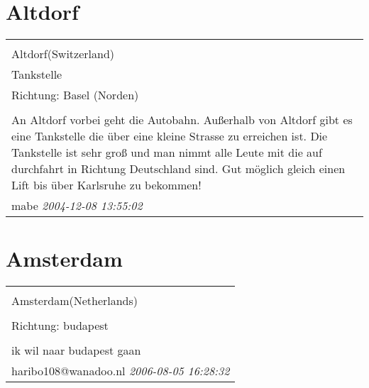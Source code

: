 \documentclass[a4paper,12pt]{article}
\begin{document}
\section{Altdorf}
\begin{tabular}{|p{13cm}|}
\hline\\
Altdorf(Switzerland)\\
Tankstelle\\
Richtung: Basel (Norden) \\
\hline\\
An Altdorf vorbei geht die Autobahn. Außerhalb von Altdorf gibt es eine Tankstelle die über eine kleine Strasse zu erreichen ist. Die Tankstelle ist sehr groß und man nimmt alle Leute mit die auf durchfahrt in Richtung Deutschland sind. Gut möglich gleich einen Lift bis über Karlsruhe zu bekommen! \\
mabe \textit{ 2004-12-08 13:55:02 }\\\hline
\end{tabular}


\section{Amsterdam}
\begin{tabular}{|p{13cm}|}
\hline\\
Amsterdam(Netherlands)\\
\\
Richtung: budapest \\
\hline\\
ik wil naar budapest gaan \\
haribo108@wanadoo.nl \textit{ 2006-08-05 16:28:32 }\\\hline
\end{tabular}
\end{document}
